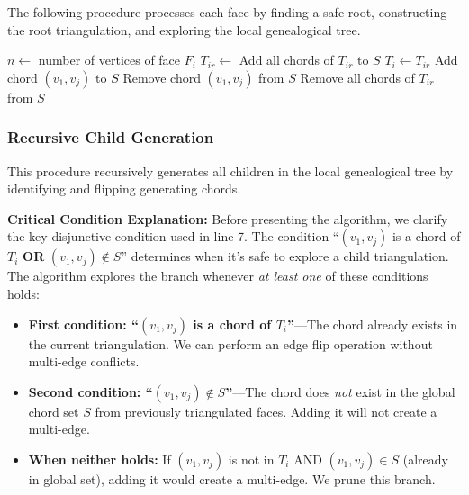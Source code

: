 \documentclass[12pt,a4paper]{article}
\theoremstyle{definition}
\theoremstyle{remark}
\begin{document}
The following procedure processes each face by finding a safe root, constructing the root triangulation, and exploring the local genealogical tree.

\begin{algorithm}
\caption{Find All Triangulations for Current Face}
\label{alg:face_triangulation}
\begin{algorithmic}[1]
    \State $n \gets$ number of vertices of face $F_i$
    \State $T_{ir} \gets$  
    \State Add all chords of $T_{ir}$ to $S$ 
    \State {}
    \State $T_i \gets T_{ir}$
        \State Add chord $(v_1, v_j)$ to $S$
        \State {}
        \State Remove chord $(v_1, v_j)$ from $S$
    \EndFor
    \State Remove all chords of $T_{ir}$ from $S$ 
\EndProcedure
\end{algorithmic}
\end{algorithm}



\subsubsection{Recursive Child Generation}

This procedure recursively generates all children in the local genealogical tree by identifying and flipping generating chords.

\textbf{Critical Condition Explanation:} Before presenting the algorithm, we clarify the key disjunctive condition used in line 7. The condition ``$(v_1, v_j)$ is a chord of $T_i$ \textbf{OR} $(v_1, v_j) \notin S$'' determines when it's safe to explore a child triangulation. The algorithm explores the branch whenever \emph{at least one} of these conditions holds:

\begin{itemize}
    \item \textbf{First condition: ``$(v_1, v_j)$ is a chord of $T_i$''}---The chord already exists in the current triangulation. We can perform an edge flip operation without multi-edge conflicts.
    
    \item \textbf{Second condition: ``$(v_1, v_j) \notin S$''}---The chord does \emph{not} exist in the global chord set $S$ from previously triangulated faces. Adding it will not create a multi-edge.
    
    \item \textbf{When neither holds:} If $(v_1, v_j)$ is not in $T_i$ AND $(v_1, v_j) \in S$ (already in global set), adding it would create a multi-edge. We prune this branch.
\end{itemize}
\end{document}
